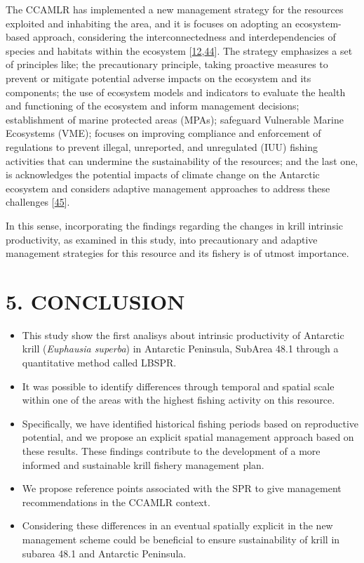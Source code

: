 \documentclass[
]{article}
\begin{document}
The CCAMLR has implemented a new management strategy for the resources
exploited and inhabiting the area, and it is focuses on adopting an
ecosystem-based approach, considering the interconnectedness and
interdependencies of species and habitats within the ecosystem
{[}\protect\hyperlink{ref-McBride2021}{12},\protect\hyperlink{ref-CCAMLR2021}{44}{]}.
The strategy emphasizes a set of principles like; the precautionary
principle, taking proactive measures to prevent or mitigate potential
adverse impacts on the ecosystem and its components; the use of
ecosystem models and indicators to evaluate the health and functioning
of the ecosystem and inform management decisions; establishment of
marine protected areas (MPAs); safeguard Vulnerable Marine Ecosystems
(VME); focuses on improving compliance and enforcement of regulations to
prevent illegal, unreported, and unregulated (IUU) fishing activities
that can undermine the sustainability of the resources; and the last
one, is acknowledges the potential impacts of climate change on the
Antarctic ecosystem and considers adaptive management approaches to
address these challenges
{[}\protect\hyperlink{ref-Chavez_Molina2023}{45}{]}.

In this sense, incorporating the findings regarding the changes in krill
intrinsic productivity, as examined in this study, into precautionary
and adaptive management strategies for this resource and its fishery is
of utmost importance.

\newpage

\hypertarget{conclusion}{%
\section{5. CONCLUSION}\label{conclusion}}

\begin{itemize}
\item
  This study show the first analisys about intrinsic productivity of
  Antarctic krill (\emph{Euphausia superba}) in Antarctic Peninsula,
  SubArea 48.1 through a quantitative method called LBSPR.
\item
  It was possible to identify differences through temporal and spatial
  scale within one of the areas with the highest fishing activity on
  this resource.
\item
  Specifically, we have identified historical fishing periods based on
  reproductive potential, and we propose an explicit spatial management
  approach based on these results. These findings contribute to the
  development of a more informed and sustainable krill fishery
  management plan.
\item
  We propose reference points associated with the SPR to give management
  recommendations in the CCAMLR context.
\item
  Considering these differences in an eventual spatially explicit in the
  new management scheme could be beneficial to ensure sustainability of
  krill in subarea 48.1 and Antarctic Peninsula.
\end{itemize}
\end{document}
